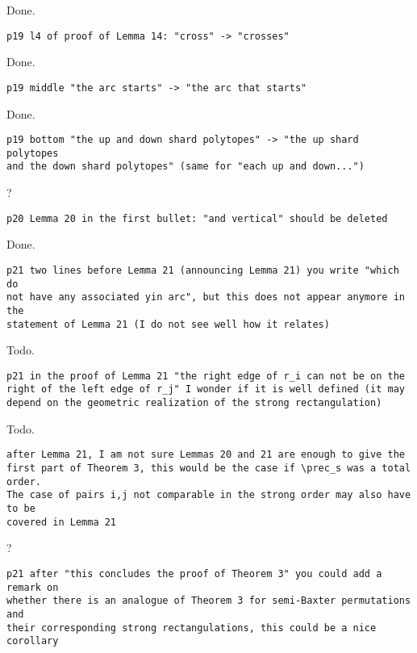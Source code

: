 \documentclass{article}
\begin{document}
Done.

\begin{verbatim}
p19 l4 of proof of Lemma 14: "cross" -> "crosses"
\end{verbatim}

Done.

\begin{verbatim}
p19 middle "the arc starts" -> "the arc that starts"
\end{verbatim}

Done.

\begin{verbatim}
p19 bottom "the up and down shard polytopes" -> "the up shard polytopes 
and the down shard polytopes" (same for "each up and down...")
\end{verbatim}

?

\begin{verbatim}
p20 Lemma 20 in the first bullet: "and vertical" should be deleted
\end{verbatim}

Done.

\begin{verbatim}
p21 two lines before Lemma 21 (announcing Lemma 21) you write "which do 
not have any associated yin arc", but this does not appear anymore in the 
statement of Lemma 21 (I do not see well how it relates)
\end{verbatim}

Todo.

\begin{verbatim}
p21 in the proof of Lemma 21 "the right edge of r_i can not be on the 
right of the left edge of r_j" I wonder if it is well defined (it may 
depend on the geometric realization of the strong rectangulation)
\end{verbatim}

Todo.

\begin{verbatim}
after Lemma 21, I am not sure Lemmas 20 and 21 are enough to give the 
first part of Theorem 3, this would be the case if \prec_s was a total order. 
The case of pairs i,j not comparable in the strong order may also have to be 
covered in Lemma 21
\end{verbatim}

?

\begin{verbatim}
p21 after "this concludes the proof of Theorem 3" you could add a remark on 
whether there is an analogue of Theorem 3 for semi-Baxter permutations and 
their corresponding strong rectangulations, this could be a nice corollary
\end{verbatim}
\end{document}
